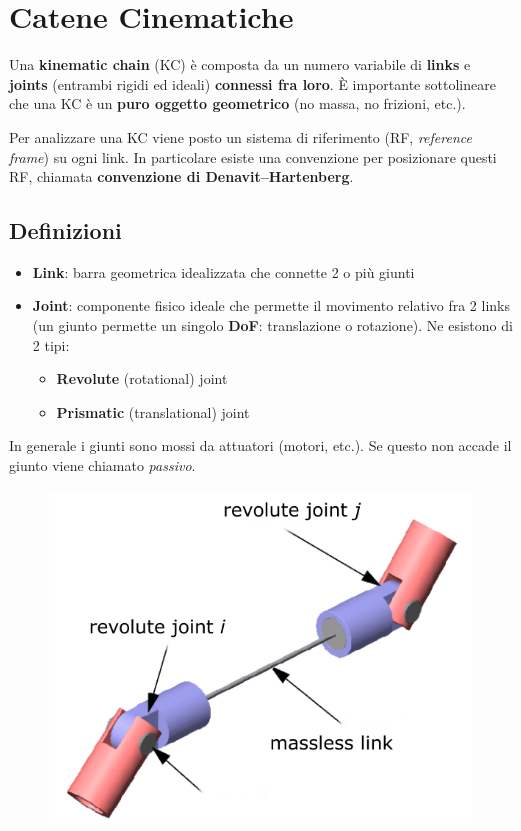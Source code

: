 \chapter{Catene Cinematiche}

Una \textbf{kinematic chain} (KC) è composta da un numero variabile di \textbf{links} e \textbf{joints} (entrambi rigidi ed ideali) \textbf{connessi fra loro}. È importante sottolineare che una KC è un \textbf{puro oggetto geometrico} (no massa, no frizioni, etc.).

Per analizzare una KC viene posto un sistema di riferimento (RF, \textit{reference frame}) su ogni link. In particolare esiste una convenzione per posizionare questi RF, chiamata \textbf{convenzione di Denavit–Hartenberg}.



\section{Definizioni}

\begin{itemize}
	\item \textbf{Link}: barra geometrica idealizzata che connette 2 o più giunti
	\item \textbf{Joint}: componente fisico ideale che permette il movimento relativo fra 2 links (un giunto permette un singolo \textbf{DoF}: translazione o rotazione). Ne esistono di 2 tipi:
	\begin{itemize}
		\item \textbf{Revolute} (rotational) joint
		\item \textbf{Prismatic} (translational) joint
	\end{itemize}
\end{itemize}

In generale i giunti sono mossi da attuatori (motori, etc.). Se questo non accade il giunto viene chiamato \textit{passivo}.

\begin{figure}[H]
	\centering
	\includegraphics[width=0.5\linewidth]{images/kinematic_chains_1}
	\label{fig:kinematicchains1}
\end{figure}

